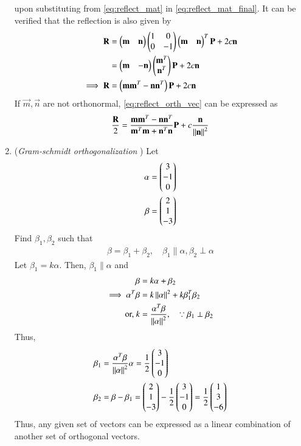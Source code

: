 \begin{enumerate}[label=\thesection.\arabic*.,ref=\thesection.\theenumi]
upon substituting from \eqref{eq:reflect_mat} in \eqref{eq:reflect_mat_final}.
It can be verified that 
the reflection is also given by
\begin{align}
\mathbf{R} &= \begin{pmatrix}\mathbf{m} & \mathbf{n}\end{pmatrix}\begin{pmatrix}1 & 0 \\ 0 & -1\end{pmatrix}\begin{pmatrix}\mathbf{m} & \mathbf{n}\end{pmatrix}^T \mathbf{P}+2c \mathbf{n}
\\
 &= \begin{pmatrix}\mathbf{m} & -\mathbf{n}\end{pmatrix}\begin{pmatrix}\mathbf{m}^T \\ \mathbf{n}^T\end{pmatrix} \mathbf{P}+2c \mathbf{n}
\\
\implies \mathbf{R}&= \left(\mathbf{m}\mathbf{m}^T-\mathbf{n}\mathbf{n}^T\right)\mathbf{P} + 2c \mathbf{n} 
\label{eq:reflect_orth_vec}
\end{align}
If $\vec{m}, \vec{n}$ are not orthonormal, \eqref{eq:reflect_orth_vec}
can be expressed as
\begin{align}
 \frac{\mathbf{R}}{2}= \frac{\mathbf{m}\mathbf{m}^T-\mathbf{n}\mathbf{n}^T}{\mathbf{m}^T\mathbf{m}+\mathbf{n}^T\mathbf{n}}\mathbf{P} + c \frac{\mathbf{n}}{\left\lVert\mathbf{n}\right\rVert^2}
\label{eq:reflect_non_orth_vec}
\end{align}
\item ({\em Gram-schmidt orthogonalization }) Let 
\begin{align}
{\alpha} &= \begin{pmatrix}3\\-1\\0\end{pmatrix}
\\
 {\beta} &= \begin{pmatrix}2\\1\\-3\end{pmatrix}
\end{align}
Find ${\beta}_1, {\beta}_2 $ such 
that 
\begin{align}
{\beta}={\beta}_1+{\beta}_2, \quad {\beta}_1 \parallel  {\alpha},{\beta}_2 \perp {\alpha} 
\end{align}
%
\label{prob:line_gram_schmidt}
\solution Let ${\beta}_1 = k{\alpha}$.  Then, ${\beta}_1 \parallel {\alpha}$ and 
%
\begin{align}
{\beta} &= k{\alpha}+{\beta}_2
\\
\implies {\alpha}^T{\beta} &= k\left\lVert\alpha\right\rVert^2+k{\beta}_1^T{\beta}_2
\\
\text{or, } k &= \frac{{\alpha}^T{\beta}}{\left\lVert{\alpha}\right\rVert^2}, \quad \because {\beta}_1 \perp {\beta}_2
\end{align}
%
Thus,
%
\begin{align}
{\beta}_1 &= \frac{{\alpha}^T{\beta}}{\left\lVert{\alpha}\right\rVert^2}{\alpha} = \frac{1}{2}\begin{pmatrix}3\\-1\\0\end{pmatrix}
\\
{\beta}_2 &= {\beta}-{\beta}_1 = \begin{pmatrix}2\\1\\-3\end{pmatrix}- \frac{1}{2}\begin{pmatrix}3\\-1\\0\end{pmatrix} = \frac{1}{2}\begin{pmatrix}1\\3\\-6\end{pmatrix}
\end{align}
%
Thus, any given set of vectors can be expressed as a linear combination of another set of orthogonal vectors.  

\end{enumerate}
